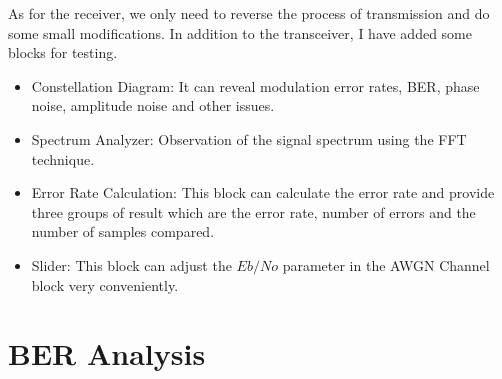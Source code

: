\documentclass[11pt]{article}
\numberwithin{figure}{section}
\numberwithin{equation}{section}
\begin{document}
As for the receiver, we only need to reverse the process of transmission and do some small modifications. In addition to the transceiver, I have added some blocks for testing.
\begin{itemize}
    \item Constellation Diagram: It can reveal modulation error rates, BER, phase noise, amplitude noise and other issues.
    \item Spectrum Analyzer: Observation of the signal spectrum using the FFT technique.
    \item Error Rate Calculation: This block can calculate the error rate and provide three groups of result which are the error rate, number of errors and the number of samples compared.
    \item Slider: This block can adjust the $Eb/No$ parameter in the AWGN Channel block very conveniently.
\end{itemize}
\section{BER Analysis}
\end{document}
